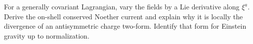 \SupplementaryEditorialNote
\begin{enumerate}[leftmargin=2.8em,itemsep=1.2em]
For a generally covariant Lagrangian, vary the fields by a Lie derivative
along \(\xi^a\).  Derive the on-shell conserved Noether current and explain
why it is locally the divergence of an antisymmetric charge two-form.  Identify
that form for Einstein gravity up to normalization.
\end{enumerate}
